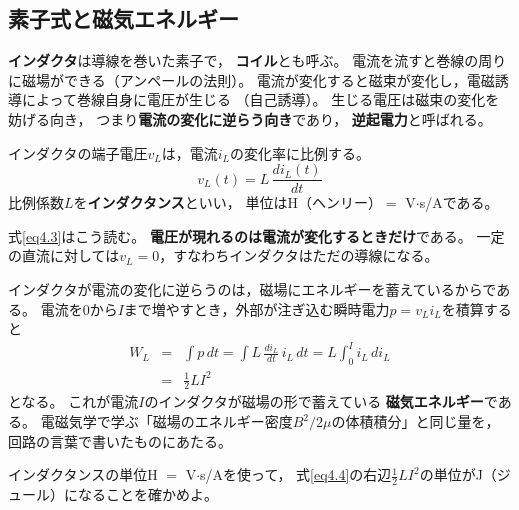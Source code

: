 \subsection{素子式と磁気エネルギー}

\textbf{インダクタ}は導線を巻いた素子で，
\textbf{コイル}とも呼ぶ。
電流を流すと巻線の周りに磁場ができる（アンペールの法則）。
電流が変化すると磁束が変化し，電磁誘導によって巻線自身に電圧が生じる
（自己誘導）。
生じる電圧は磁束の変化を妨げる向き，
つまり\textbf{電流の変化に逆らう向き}であり，
\textbf{逆起電力}と呼ばれる。

\begin{定義}[インダクタ]
\label{def4.1}
インダクタの端子電圧$v_L$は，電流$i_L$の変化率に比例する。
\begin{equation}
v_L(t) = L\,\frac{di_L(t)}{dt}
\label{eq4.3}
\end{equation}
比例係数$L$を\textbf{インダクタンス}といい，
単位はH（ヘンリー）$=$ V$\cdot$s/Aである。
\end{定義}

式\ref{eq4.3}はこう読む。
\textbf{電圧が現れるのは電流が変化するときだけ}である。
一定の直流に対しては$v_L = 0$，すなわちインダクタはただの導線になる。

インダクタが電流の変化に逆らうのは，磁場にエネルギーを蓄えているからである。
電流を$0$から$I$まで増やすとき，外部が注ぎ込む瞬時電力$p = v_L i_L$を積算すると
\begin{eqnarray}
W_L &=& \int p\,dt = \int L\,\frac{di_L}{dt}\,i_L\,dt
= L\int_0^{I} i_L\,di_L \nonumber\\
&=& \frac{1}{2}LI^2
\label{eq4.4}
\end{eqnarray}
となる。
これが電流$I$のインダクタが磁場の形で蓄えている
\textbf{磁気エネルギー}である。
電磁気学で学ぶ「磁場のエネルギー密度$B^2/2\mu$の体積積分」と同じ量を，
回路の言葉で書いたものにあたる。

\begin{問}
\item インダクタンスの単位H $=$ V$\cdot$s/Aを使って，
式\ref{eq4.4}の右辺$\frac{1}{2}LI^2$の単位がJ（ジュール）になることを確かめよ。
\end{問}

\subsection{}

